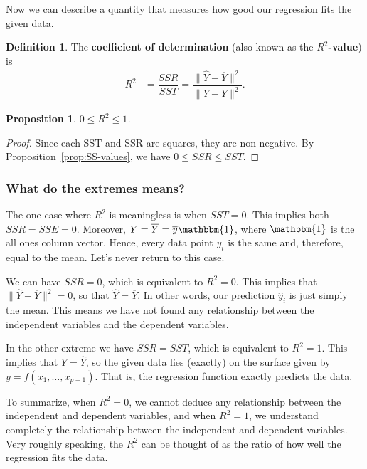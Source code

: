 \documentclass[a4paper, 12pt]{article}
\numberwithin{equation}{section}
\numberwithin{figure}{section}
\newtheorem{prop}[thm]{Proposition}
\theoremstyle{definition}
\newtheorem{defn}[thm]{Definition}
\renewcommand{\leq}{\leqslant}
\begin{document}
Now we can describe a quantity that measures how good our regression fits the
given data. 

\begin{defn}
	The \textbf{coefficient of determination} (also known as the
	\textbf{$R^2$-value}) is 
	\begin{align*} 
		R^2 &= \dfrac{SSR}{SST} = \dfrac{\|\widehat{Y} - \overline{Y}\|^2}{\| Y - \overline{Y}\|^2} .
	\end{align*} 
\end{defn}

\begin{prop}
	$0\leq R^2 \leq 1$.
\end{prop}

\begin{proof}
	Since each SST and SSR are squares, they are non-negative. By
	Proposition~\ref{prop:SS-values}, we have $0\leq SSR\leq SST$.
\end{proof}

\subsubsection{What do the extremes means?}

The one case where $R^2$ is meaningless is when $SST=0$. This implies both
$SSR=SSE=0$. Moreover, $Y = \overline{Y} = \overline{y} \mathbbm{1}$, where
$\mathbbm{1}$ is the all ones column vector. Hence, every data point $y_i$ is
the same and, therefore, equal to the mean. Let's never return to this case.

We can have $SSR=0$, which is equivalent to $R^2=0$. This implies that $\|
\widehat{Y} - \overline{Y}\|^2= 0$, so that $\widehat{Y} = \overline{Y}$. In
other words, our prediction $\widehat{y}_i$ is just simply the mean. This means
we have not found any relationship between the independent variables and the
dependent variables. 

In the other extreme we have $SSR=SST$, which is equivalent to $R^2=1$. This
implies that $Y = \widehat{Y}$, so the given data lies (exactly) on the surface
given by $y=f(x_1,\dots, x_{p-1})$. That is, the regression function exactly
predicts the data. 

To summarize, when $R^2=0$, we cannot deduce any relationship between the
independent and dependent variables, and when $R^2=1$, we understand completely
the relationship between the independent and dependent variables. Very roughly
speaking, the $R^2$ can be thought of as the ratio of how well the regression
fits the data. 
\end{document}
